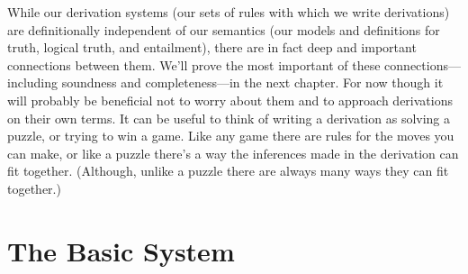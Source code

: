 While our derivation systems (our sets of rules with which we write derivations) are definitionally independent of our semantics (our models and definitions for truth, logical truth, and entailment), there are in fact deep and important connections between them. 
We'll prove the most important of these connections---including soundness and completeness---in the next chapter. 
For now though it will probably be beneficial not to worry about them and to approach derivations on their own terms. 
It can be useful to think of writing a derivation as solving a puzzle, or trying to win a game. 
Like any game there are rules for the moves you can make, or like a puzzle there's a way the inferences made in the derivation can fit together. 
(Although, unlike a puzzle there are always many ways they can fit together.) 

\section{The Basic System \GSD{}}

